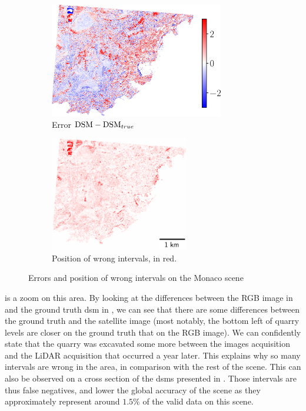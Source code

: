 \begin{figure}
    \begin{subfigure}[t]{0.495\linewidth}
        \flushleft
        \includegraphics[height=5cm]{Images/Chap_6/Monaco_errors.png}
        \caption{Error $\mathrm{DSM}-\mathrm{DSM}_{true}$}
        \label{fig:Monaco_errors}
    \end{subfigure}
    \begin{subfigure}[t]{0.495\linewidth}
        \flushright
        \includegraphics[height=5cm]{Images/Chap_6/Monaco_wrong_intervals.png}
        \caption{Position of wrong intervals, in red.}
        \label{fig:Monaco_wrong_intervals}
    \end{subfigure}
    \caption{Errors and position of wrong intervals on the Monaco scene}
    \label{fig:Monaco_errors_global}
\end{figure}

 is a zoom on this area. By looking at the differences between the RGB image in  and the ground truth \acrshort{dsm} in , we can see that there are some differences between the ground truth and the satellite image (most notably, the bottom left of quarry levels are closer on the ground truth that on the RGB image). We can confidently state that the quarry was excavated some more between the images acquisition and the LiDAR acquisition that occurred a year later. This explains why so many intervals are wrong in the area, in comparison with the rest of the scene. This can also be observed on a cross section of the \acrshort{dsm}s presented in . Those intervals are thus false negatives, and lower the global accuracy of the scene as they approximately represent around $1.5\%$ of the valid data on this scene.

